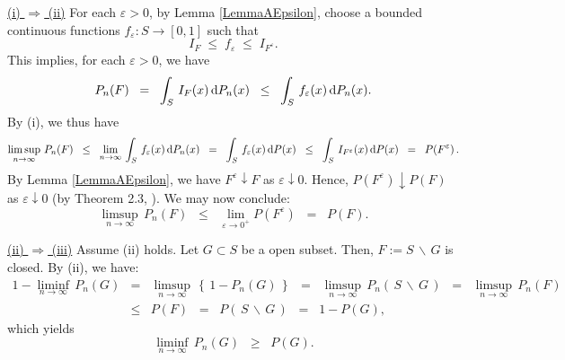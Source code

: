 \proof
\vskip 0.3cm
\noindent
\underline{(i) $\Longrightarrow$ (ii)}
\vskip 0.2cm
\noindent
For each $\varepsilon > 0$, by Lemma \ref{LemmaAEpsilon}, choose
a bounded continuous functions $f_{\varepsilon} : S \longrightarrow [0,1]$ such that
\begin{equation*}
I_{F} \; \leq \; f_{\varepsilon} \; \leq \; I_{F^{\varepsilon}}.
\end{equation*}
This implies, for each $\varepsilon > 0$, we have
\begin{equation*}
P_{n}(F)
\;\; = \;\; \int_{S}\,I_{F}(x)\,\textnormal{d} P_{n}(x)
\;\; \leq \;\; \int_{S}\,f_{\varepsilon}(x)\,\textnormal{d} P_{n}(x).
\end{equation*}
By (i), we thus have
\begin{equation*}
\limsup_{n\rightarrow\infty}\,P_{n}(F)
\;\;\leq\;\; \lim_{n\rightarrow\infty}\,\int_{S}\,f_{\varepsilon}(x)\,\textnormal{d} P_{n}(x)
\;\;=\;\; \int_{S}\,f_{\varepsilon}(x)\,\textnormal{d} P(x)
\;\;\leq\;\; \int_{S}\,I_{F^{\varepsilon}}(x)\,\textnormal{d} P(x)
\;\;=\;\; P\!\left(F^{\varepsilon}\right).
\end{equation*}
By Lemma \ref{LemmaAEpsilon}, we have $F^{\varepsilon}\downarrow F$ as $\varepsilon\downarrow 0$.
Hence, $P\!\left(F^{\varepsilon}\right)\downarrow P(F)$ as $\varepsilon\downarrow 0$ (by Theorem 2.3, \cite{JacodProtter}).
We may now conclude:
\begin{equation*}
\limsup_{n\rightarrow\infty}\,P_{n}(F)
\;\;\leq\;\; \lim_{\varepsilon\rightarrow 0^{+}}P\!\left(F^{\varepsilon}\right)
\;\;=\;\; P\!\left(F\right).
\end{equation*}

\vskip 0.3cm
\noindent
\underline{(ii) $\Longrightarrow$ (iii)}
\vskip 0.2cm
\noindent
Assume (ii) holds. Let $G \subset S$ be a open subset.
Then, $F := S\,\backslash\,G$ is closed. By (ii), we have:
\begin{eqnarray*}
1 - \liminf_{n\rightarrow\infty}\,P_{n}\!\left(G\right)
&=& \limsup_{n\rightarrow\infty}\,\left\{\,1 - P_{n}\!\left(G\right)\,\right\}
\;\;=\;\;\limsup_{n\rightarrow\infty}\,P_{n}\!\left(\,S\,\backslash\,G\,\right)
\;\;=\;\;\limsup_{n\rightarrow\infty}\,P_{n}(F)
\\
&\leq& P\!\left(F\right)
\;\;=\;\; P\!\left(\,S\,\backslash\,G\,\right)
\;\;=\;\; 1 - P\!\left(G\right),
\end{eqnarray*}
which yields
\begin{equation}
\liminf_{n\rightarrow\infty}\,P_{n}\!\left(G\right)
\;\;\geq\;\; P\!\left(G\right).
\end{equation}

